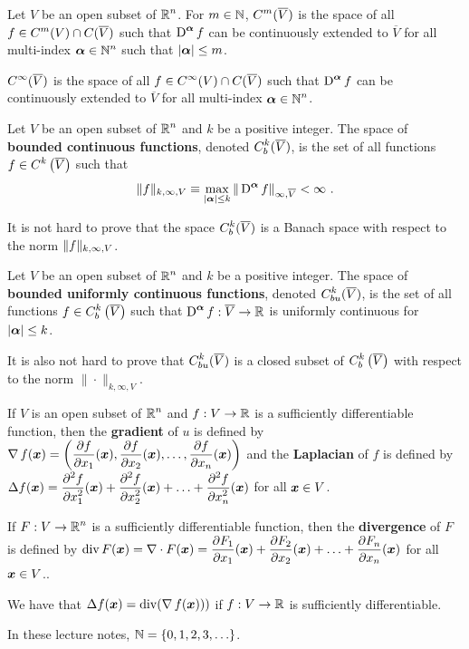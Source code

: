 \begin{defn*}
Let $V$ be an open subset of $\displaystyle \mathbb{R}^n$.  For $m\in \mathbb{N}$,
$\displaystyle C^m(\overline{V})$ is the space of all
$\displaystyle f \in C^m(V) \cap C(\overline{V})$ such that
$\displaystyle \operatorname{D}^{{\bm{\alpha}}} f$ can be continuously extended
to $\overline{V}$ for
all multi-index $\displaystyle {\bm{\alpha}} \in \mathbb{N}^n$ such that
$|{\bm{\alpha}}|\leq m$.

$\displaystyle C^\infty(\overline{V})$ is the space of all
$\displaystyle f \in C^\infty(V) \cap C(\overline{V})$ such that
$\displaystyle \operatorname{D}^{{\bm{\alpha}}} f$ can be continuously extended to
$\overline{V}$ for all multi-index $\displaystyle {\bm{\alpha}} \in \mathbb{N}^n$.
\end{defn*}

\begin{defn*}
Let $V$ be an open subset of $\displaystyle \mathbb{R}^n$ and $k$ be a
positive integer.  The space of {\bfseries bounded continuous
functions}, denoted
$\displaystyle C_b^k(\overline{V})$, is the set of all functions
$\displaystyle f\in C^k\left(\overline{V}\right)$ such that
\[
\|f\|_{k,\infty,V} \equiv \max_{|\VEC{\alpha}|\leq k}
\|\diff^{\VEC{\alpha}} f\|_{\infty,\overline{V}} < \infty \ .
\]
\end{defn*}

It is not hard to prove that the space
$\displaystyle C^k_b(\overline{V})$ is a Banach space
with respect to the norm $\displaystyle \|f\|_{k,\infty,V}$.

\begin{defn*}
Let $V$ be an open subset of $\displaystyle \mathbb{R}^n$ and $k$ be a
positive integer.  The space of {\bfseries bounded uniformly continuous
functions}, denoted
$\displaystyle C_{bu}^k(\overline{V})$, is the set of all functions
$\displaystyle f\in C_b^k\left(\overline{V}\right)$ such that
$\displaystyle \operatorname{D}^{{\bm{\alpha}}} f:\overline{V} \to \mathbb{R}$ is uniformly
continuous for $|{\bm{\alpha}}| \leq k$.
\end{defn*}

It is also not hard to prove that
$\displaystyle C_{bu}^k(\overline{V})$ is a closed subset of
$\displaystyle C_b^k\left(\overline{V}\right)$ with respect to the
norm $\|\cdot\|_{k,\infty,V}$.

\begin{defn}
If $V$ is an open subset of $\displaystyle \mathbb{R}^n$ and $f:V \to \mathbb{R}$ is a
sufficiently differentiable function, then the
{\bfseries gradient} of $u$ is defined by
$\displaystyle \operatorname{\nabla} f({\bm{x}})
= \left( \frac{\partial{f}}{\partial x_1}({\bm{x}}) , \frac{\partial{f}}{\partial x_2}({\bm{x}}) ,
\ldots, \frac{\partial{f}}{\partial x_n}({\bm{x}}) \right)$ and the
{\bfseries Laplacian} of $f$ is defined by
$\displaystyle \Delta f({\bm{x}})
= \frac{\displaystyle \partial^{2}{f}} {\displaystyle \partial x_1^{2}}({\bm{x}}) + \frac{\displaystyle \partial^{2}{f}} {\displaystyle \partial x_2^{2}}({\bm{x}}) +
\ldots + \frac{\displaystyle \partial^{2}{f}} {\displaystyle \partial x_n^{2}}({\bm{x}})$ for all ${\bm{x}} \in V$.

If $\displaystyle F:V \to \mathbb{R}^n$ is a sufficiently differentiable
function, then the {\bfseries divergence} of $F$ is
defined by $\displaystyle \operatorname{div} F({\bm{x}}) = \nabla \cdot F({\bm{x}})
= \frac{\partial{F_1}}{\partial x_1}({\bm{x}}) + \frac{\partial{F_2}}{\partial x_2}({\bm{x}}) +
\ldots + \frac{\partial{F_n}}{\partial x_n}({\bm{x}})$ for all ${\bm{x}} \in V$..
\end{defn}

We have that $\Delta f({\bm{x}}) = \operatorname{div} (\operatorname{\nabla} f({\bm{x}})))$
if $f:V \to \mathbb{R}$ is sufficiently differentiable.

 In these lecture notes, $\mathbb{N} = \{0,1,2,3, \ldots\}$.

